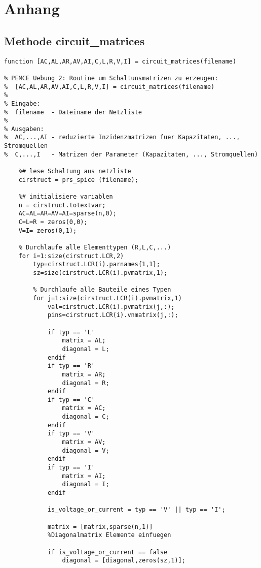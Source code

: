\section*{Anhang}
\subsection*{Methode circuit\_matrices}
\begin{lstlisting}[caption={Methode \texttt{circuit\_matrices} in Octave}, label=circuit_matrices]
function [AC,AL,AR,AV,AI,C,L,R,V,I] = circuit_matrices(filename)

% PEMCE Uebung 2: Routine um Schaltunsmatrizen zu erzeugen:
%  [AC,AL,AR,AV,AI,C,L,R,V,I] = circuit_matrices(filename)
%
% Eingabe:
%  filename  - Dateiname der Netzliste
%
% Ausgaben:
%  AC,...,AI - reduzierte Inzidenzmatrizen fuer Kapazitaten, ..., Stromquellen
%  C,...,I   - Matrizen der Parameter (Kapazitaten, ..., Stromquellen)
	
	%# lese Schaltung aus netzliste
	cirstruct = prs_spice (filename);
	
	%# initialisiere variablen
	n = cirstruct.totextvar;
	AC=AL=AR=AV=AI=sparse(n,0);
	C=L=R = zeros(0,0);
	V=I= zeros(0,1);
	
	% Durchlaufe alle Elementtypen (R,L,C,...)
	for i=1:size(cirstruct.LCR,2)
		typ=cirstruct.LCR(i).parnames{1,1};
		sz=size(cirstruct.LCR(i).pvmatrix,1);
	
		% Durchlaufe alle Bauteile eines Typen
		for j=1:size(cirstruct.LCR(i).pvmatrix,1)
			val=cirstruct.LCR(i).pvmatrix(j,:);
			pins=cirstruct.LCR(i).vnmatrix(j,:);
			
			if typ == 'L'
				matrix = AL;
				diagonal = L;
			endif 
			if typ == 'R'
				matrix = AR;
				diagonal = R;
			endif 
			if typ == 'C'
				matrix = AC;
				diagonal = C;
			endif 
			if typ == 'V'
				matrix = AV;
				diagonal = V;
			endif  
			if typ == 'I'
				matrix = AI;
				diagonal = I;  
			endif
			
			is_voltage_or_current = typ == 'V' || typ == 'I';
			
			matrix = [matrix,sparse(n,1)]
			%Diagonalmatrix Elemente einfuegen
			
			if is_voltage_or_current == false
				diagonal = [diagonal,zeros(sz,1)];
			

\end{lstlisting}
